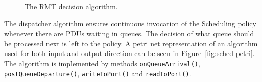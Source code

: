             \begin{figure}[H]
                \begin{center}
                  \caption{The RMT decision algorithm.}
                  \label{fig:rmt-fsm}
                \end{center}
            \end{figure}

            The dispatcher algorithm ensures continuous invocation of the Scheduling policy whenever there are PDUs waiting in queues. The decision of what queue should be processed next is left to the policy. A petri net representation of an algorithm used for both input and output direction can be seen in Figure~\ref{fig:sched-petri}. The algorithm is implemented by methods \texttt{onQueueArrival()}, \texttt{postQueueDeparture()}, \texttt{writeToPort()} and \texttt{readToPort()}.

